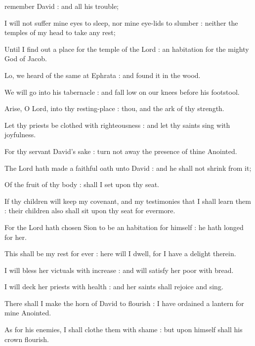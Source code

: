  remember David : and all his trouble;\par
{}
I will not suffer mine eyes to sleep, nor mine eye-lids to slumber : neither the temples of my head to take any rest;\par
{}Until I find out a place for the temple of the Lord : an habitation for the mighty God of Jacob.\par
{}Lo, we heard of the same at Ephrata : and found it in the wood.\par
{}We will go into his tabernacle : and fall low on our knees before his footstool.\par
{}Arise, O Lord, into thy resting-place : thou, and the ark of thy strength.\par
{}Let thy priests be clothed with righteousness : and let thy saints sing with joyfulness.\par
{}For thy servant David's sake : turn not away the presence of thine Anointed.\par
{}The Lord hath made a faithful oath unto David : and he shall not shrink from it;\par
{}Of the fruit of thy body : shall I set upon thy seat.\par
{}If thy children will keep my covenant, and my testimonies that I shall learn them : their children also shall sit upon thy seat for evermore.\par
{}For the Lord hath chosen Sion to be an habitation for himself : he hath longed for her.\par
{}This shall be my rest for ever : here will I dwell, for I have a delight therein.\par
{}I will bless her victuals with increase : and will satisfy her poor with bread.\par
{}I will deck her priests with health : and her saints shall rejoice and sing.\par
{}There shall I make the horn of David to flourish : I have ordained a lantern for mine Anointed.\par
{}As for his enemies, I shall clothe them with shame : but upon himself shall his crown flourish.\par

